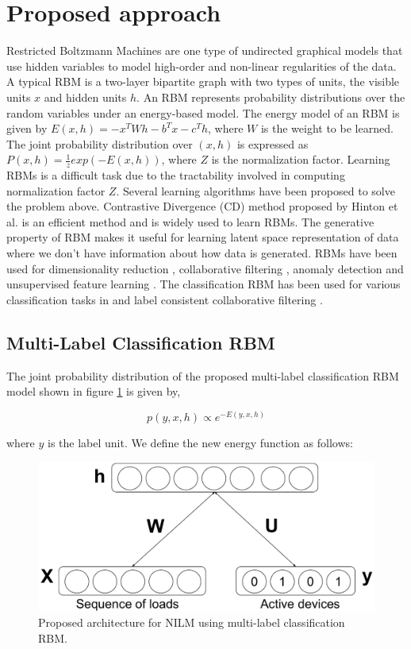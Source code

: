 \documentclass{article}
\begin{document}
\section{Proposed approach}
Restricted Boltzmann Machines \cite{Smolensky1986} are one type of undirected graphical models that use hidden variables to model high-order and non-linear regularities of the data. A typical RBM is a two-layer bipartite graph with two types of units, the visible units $x$ and hidden units $h$. An RBM represents probability distributions over the random variables under an energy-based model. The energy model of an RBM is given by $E(x,h) = -x^TWh-b^Tx-c^Th$, where $W$ is the weight to be learned. The joint probability distribution over $(x,h)$ is expressed as $P(x,h) = \frac{1}{z}exp(-E(x,h))$, where $Z$ is the normalization factor. Learning RBMs is a difficult task due to the tractability involved in computing normalization factor $Z$. Several learning algorithms have been proposed \cite{CD2002hinton, Larochelle2012, pmlr-v9-marlin10a} to solve the problem above. Contrastive Divergence (CD) method proposed by Hinton et al. \cite{CD2002hinton} is an efficient method and is widely used to learn RBMs. The generative property of RBM makes it useful for learning latent space representation of data where we don't have information about how data is generated. RBMs have been used for dimensionality reduction \cite{Hinton504}, collaborative filtering \cite{Salakhutdinov2007RBM}, anomaly detection \cite{FIORE2013anomaly} and unsupervised feature learning \cite{pmlr-v15-coates11a}. The classification RBM has been used for various classification tasks in \cite{Larochelle2008CUD, Li2015ConditionalRB} and label consistent collaborative filtering \cite{Verma2018CollaborativeFW}.

\subsection{Multi-Label Classification RBM}

The joint probability distribution of the proposed multi-label classification RBM model shown in figure \ref{fig:1} is given by,

\begin{equation}
  p(y,x,h) \propto e^{-E(y,x,h)}
  \label{eq:1}
\end{equation}

where $y$ is the label unit. We define the new energy function as follows:

\begin{figure}[!t]
  \centering
  \includegraphics[width=0.8\linewidth]{RBM_ICASSP_2018}
  \caption{Proposed architecture for NILM using multi-label classification RBM.}
  \label{fig:1}
 \end{figure}
\end{document}
